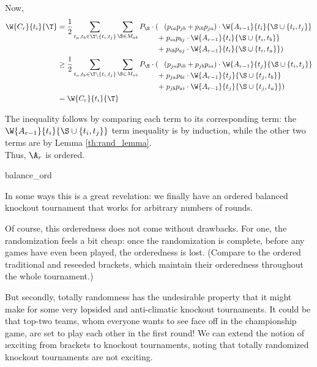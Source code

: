 {{        Now,
        \begin{align*}
            \W{C_r}{t_i}{\T} &=
                \frac{1}{2}\sum_{t_a, t_b \in \T \setminus \{t_i, t_j\}} \sum_{\S \in M_{ab}} P_\S \cdot (
                \begin{aligned}[t]
                    &(p_{ia}p_{jb} + p_{ib}p_{ja}) \cdot \W{A_{r-1}}{t_i}{\S \cup \{t_i, t_j\}}\\
                    +&\;p_{ia}p_{bj} \cdot \W{A_{r-1}}{t_i}{\S \cup \{t_i, t_b\}}\\
                    +&\;p_{ib}p_{aj} \cdot \W{A_{r-1}}{t_i}{\S \cup \{t_i, t_a\}})
                \end{aligned}
                \\
            &\geq
                \frac{1}{2}\sum_{t_a, t_b \in \T \setminus \{t_i, t_j\}} \sum_{\S \in M_{ab}} P_\S \cdot (
                \begin{aligned}[t]
                    &(p_{ja}p_{ib} + p_{jb}p_{ia}) \cdot \W{A_{r-1}}{t_j}{\S \cup \{t_i, t_j\}}\\
                    +&\;p_{ja}p_{bi} \cdot \W{A_{r-1}}{t_j}{\S \cup \{t_j, t_b\}}\\
                    +&\;p_{jb}p_{ai} \cdot \W{A_{r-1}}{t_j}{\S \cup \{t_j, t_a\}})
                \end{aligned}
                \\
            &=\W{C_r}{t_i}{\T}
        \end{align*}

        The inequality follows by comparing each term to its corresponding term: the $\W{A_{r-1}}{t_i}{\S \cup \{t_i, t_j\}}$ term inequality is by induction, while the other two terms are by Lemma \ref{th:rand_lemma}.\\

        Thus, $\A_r$ is ordered.
    }{balance_ord}
    
    In some ways this is a great revelation: we finally have an ordered balanced knockout tournament that works for arbitrary numbers of rounds.

    Of course, this orderedness does not come without drawbacks. For one, the randomization feels a bit cheap: once the randomization is complete, before any games have even been played, the orderedness is lost. (Compare to the ordered traditional and reseeded brackets, which maintain their orderedness throughout the whole tournament.)
    
    But secondly, totally randomness has the undesirable property that it might make for some very lopsided and anti-climatic knockout tournaments. It could be that top-two teams, whom everyone wants to see face off in the championship game, are set to play each other in the first round! We can extend the notion of \i{exciting} from brackets to knockout tournaments, noting that totally randomized knockout tournaments are not exciting.

}
